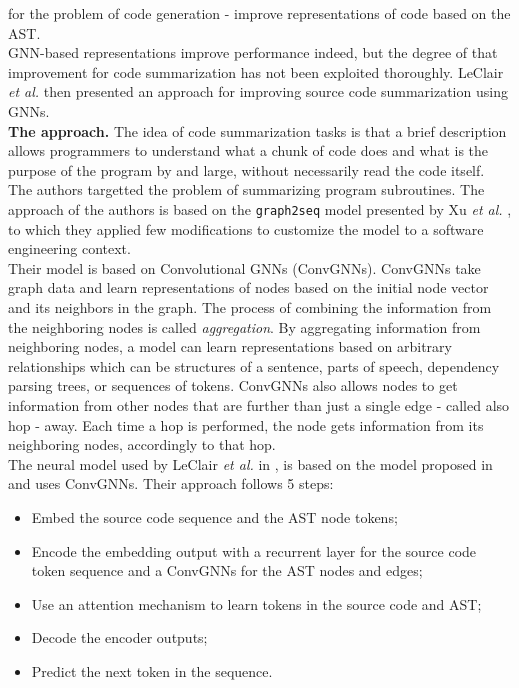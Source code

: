 for the problem of code generation - improve representations of code based on the AST.\\
GNN-based representations improve performance indeed, but the degree of that improvement 
for code summarization has not been exploited thoroughly. 
LeClair \textit{et al.} \cite{Leclair2020} then presented an approach for improving source code summarization using 
GNNs.\\
\newline
\textbf{The approach.}
The idea of code summarization tasks is that a brief description allows programmers to understand
what a chunk of code does and what is the purpose of the program by and large, without necessarily read the code 
itself. The authors targetted the problem of summarizing program subroutines.
The approach of the authors is based on the \texttt{graph2seq} model presented by Xu \textit{et al.} \cite{xu2018graph2seq}, to which they applied few modifications 
to customize the model to a software engineering context.\\
Their model is based on Convolutional GNNs (ConvGNNs). ConvGNNs take graph data and learn representations 
of nodes based on the initial node vector and its neighbors in the graph. 
The process of combining the information from the neighboring nodes is called \textit{aggregation}. By aggregating
information from neighboring nodes, a model can learn representations based on arbitrary relationships which can be structures of a sentence, parts of speech, dependency parsing 
trees, or sequences of tokens. ConvGNNs also allows nodes to get information from other nodes 
that are further than just a single edge - called also hop - away. Each time a hop is performed, 
the node gets information from its neighboring nodes, accordingly to that hop.\\
The neural model used by LeClair \textit{et al.} in \cite{Leclair2020}, is based on the model proposed in
\cite{leclair2019neural} and uses ConvGNNs. Their approach follows 5 steps:
\begin{itemize}
    \item Embed the source code sequence and the AST node tokens;
    \item Encode the embedding output with a recurrent layer for the source code token sequence and a ConvGNNs for the AST nodes and edges;
    \item Use an attention mechanism to learn tokens in the source code and AST;
    \item Decode the encoder outputs;
    \item Predict the next token in the sequence.
\end{itemize} 
